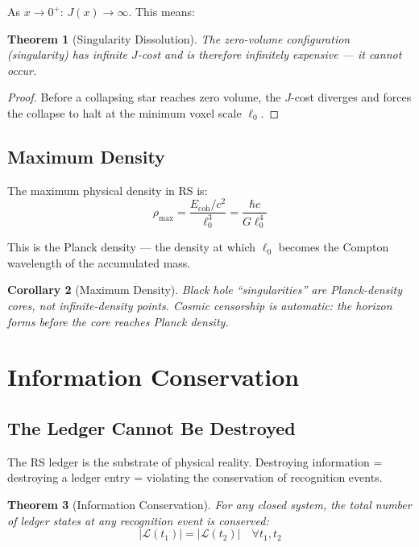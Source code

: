 \documentclass[12pt,a4paper]{article}
\newtheorem{theorem}{Theorem}[section]
\newtheorem{corollary}[theorem]{Corollary}
\theoremstyle{definition}
\theoremstyle{remark}
\begin{document}
As $x \to 0^+$: $J(x) \to \infty$. This means:

\begin{theorem}[Singularity Dissolution]
The zero-volume configuration (singularity) has infinite $J$-cost and is therefore
infinitely expensive --- it cannot occur.
\end{theorem}

\begin{proof}
Before a collapsing star reaches zero volume, the $J$-cost
diverges and forces the collapse to halt at the minimum voxel scale $\ell_0$.
\end{proof}

\subsection{Maximum Density}

The maximum physical density in RS is:
\begin{equation}
\rho_\mathrm{max} = \frac{E_\mathrm{coh}/c^2}{\ell_0^3} = \frac{\hbar c}{G \ell_0^4}
\end{equation}

This is the Planck density — the density at which $\ell_0$ becomes the Compton 
wavelength of the accumulated mass.

\begin{corollary}[Maximum Density]
Black hole ``singularities'' are Planck-density cores, not infinite-density
points. Cosmic censorship is automatic: the horizon forms before the core reaches Planck density.
\end{corollary}

\section{Information Conservation}

\subsection{The Ledger Cannot Be Destroyed}

The RS ledger is the substrate of physical reality. Destroying information = destroying 
a ledger entry = violating the conservation of recognition events.

\begin{theorem}[Information Conservation]
For any closed system, the total number of
ledger states at any recognition event is conserved:
\begin{equation}
|\mathcal{L}(t_1)| = |\mathcal{L}(t_2)| \quad \forall t_1, t_2
\end{equation}
\end{theorem}
\end{document}
